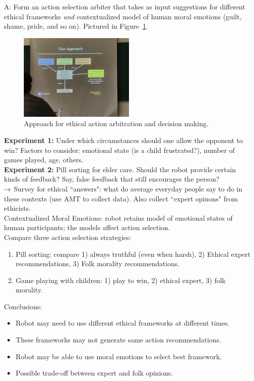 A: Form an action selection arbiter that takes as input suggestions for different ethical frameworks {\it and} contextualized model of human moral emotions (guilt, shame, pride, and so on). Pictured in Figure~\ref{fig:kant}. \\


\begin{figure}[h!]
\centering
\includegraphics[width=0.5\textwidth]{kant.JPG}
\caption{Approach for ethical action arbitration and decision making.}
\label{fig:kant}
\end{figure}

{\bf Experiment 1:} Under which circumstances should one allow the opponent to win? Factors to consider: emotional state (is a child frustrated?), number of games played, age, others. \\

{\bf Experiment 2:} Pill sorting for elder care. Should the robot provide certain kinds of feedback? Say, false feedback that still encourages the person? \\


$\rightarrow$ Survey for ethical ``answers": what do average everyday people say to do in these contexts (use AMT to collect data). Also collect ``expert opinons" from ethicists. \\


Contextualized Moral Emotions: robot retains model of emotional states of human participants; the models affect action selection. \\

Compare three action selection strategies:
\begin{enumerate}
\item Pill sorting: compare 1) always truthful (even when harsh), 2) Ethical expert recommendations, 3) Folk morality recommendations.
\item Game playing with children: 1) play to win, 2) ethical expert, 3) folk morality.
\end{enumerate}


Conclusions:
\begin{itemize}
\item Robot may need to use different ethical frameworks at different times.
\item These frameworks may not generate same action recommendations.
\item Robot may be able to use moral emotions to select best framework.
\item Possible trade-off between expert and folk opinions.
	\end{itemize}

